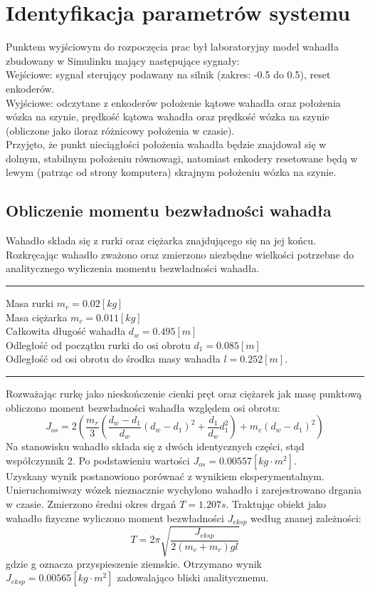 \section{Identyfikacja parametrów systemu}
Punktem wyjściowym do rozpoczęcia prac był laboratoryjny model wahadła zbudowany w Simulinku mający następujące sygnały:\\
Wejściowe: sygnał sterujący podawany na silnik (zakres: -0.5 do 0.5), reset enkoderów.\\
Wyjściowe: odczytane z enkoderów położenie kątowe wahadła oraz położenia wózka na szynie, prędkość kątowa wahadła oraz prędkość wózka na szynie (obliczone jako iloraz różnicowy położenia w czasie).\\ 
Przyjęto, że punkt nieciągłości położenia wahadła będzie znajdował się w dolnym, stabilnym położeniu równowagi, natomiast enkodery resetowane będą w lewym (patrząc od strony komputera) skrajnym położeniu wózka na szynie.
\subsection{Obliczenie momentu bezwładności wahadła}
Wahadło składa się z rurki oraz ciężarka znajdującego się na jej końcu. Rozkręcając wahadło zważono oraz zmierzono niezbędne wielkości potrzebne do analitycznego wyliczenia momentu bezwładności wahadła.\\
\noindent\rule[0.2cm]{\textwidth}{1pt}
Masa rurki $m_r=0.02[kg]$\\
Masa ciężarka $m_c=0.011[kg]$\\
Całkowita długość wahadła $d_w=0.495[m]$\\
Odległość od początku rurki do osi obrotu $d_1=0.085[m]$\\
Odległość od osi obrotu do środka masy wahadła $l=0.252[m]$.\\
\noindent\rule[0.5cm]{\textwidth}{1pt}
Rozważając rurkę jako nieskończenie cienki pręt oraz ciężarek jak masę punktową obliczono moment bezwładności wahadła względem osi obrotu: 
\begin{equation}
J_{os} = 2(\frac{m_r}{3}(\frac{d_w-d_1}{d_w}(d_w-d_1)^2+\frac{d_1}{d_w}d_1^2)+m_c(d_w-d_1)^2)
\end{equation}
Na stanowisku wahadło składa się z dwóch identycznych części, stąd współczynnik 2. Po podstawieniu wartości $J_{os} = 0.00557 [kg \cdot m^2]$.\\
Uzyskany wynik postanowiono porównać z wynikiem eksperymentalnym. Unieruchomiwszy wózek nieznacznie wychylono wahadło i zarejestrowano drgania w czasie.  Zmierzono średni okres drgań $T = 1.207s$. Traktując obiekt jako wahadło fizyczne wyliczono moment bezwładności $J_{eksp}$ według znanej zależności:
\begin{equation}
T = 2\pi\sqrt{\dfrac{J_{eksp}}{2(m_c+m_r)gl}}
\end{equation}
gdzie g oznacza przyspieszenie ziemskie.
Otrzymano wynik $J_{eksp} = 0.00565 [kg \cdot m^2]$ zadowalająco bliski analitycznemu.

